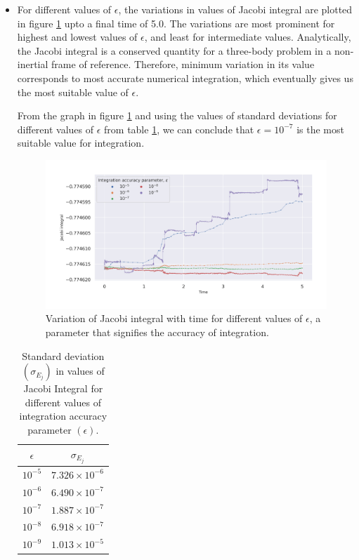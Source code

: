 \documentclass[a4paper]{article}
\begin{document}
		\begin{itemize}
			
			\item For different values of \(\epsilon\), the variations in values of Jacobi integral are plotted in figure \ref{fig:task1.3} upto a final time of 5.0. The variations are most prominent for highest and lowest values of \(\epsilon\), and least for intermediate values. Analytically, the Jacobi integral is a conserved quantity for a three-body problem in a non-inertial frame of reference. Therefore, minimum variation in its value corresponds to most accurate numerical integration, which eventually gives us the most suitable value of \(\epsilon\).
			
			From the graph in figure \ref{fig:task1.3} and using the values of standard deviations for different values of \(\epsilon\) from table \ref{table:task1.3}, we can conclude that \(\epsilon = 10^{-7}\) is the most suitable value for integration.
			
			\begin{figure} [h]
				\includegraphics[width=\columnwidth]{../task1/q3-epsilon/plots/q3.jpg}
				\caption{Variation of Jacobi integral with time for different values of \(\epsilon\), a parameter that signifies the accuracy of integration.}
				\label{fig:task1.3}
			\end{figure}
			
			\begin{table} [h]
				\centering
				\setlength{\tabcolsep}{20pt} 
				\begin{tabular} {c c}
					\toprule
					\textbf{\(\epsilon\)} & \textbf{\(\sigma_{E_j}\)} \\
					\midrule
					\addlinespace
					\(10^{-5}\) & \(7.326 \times 10^{-6}\)
					\\ 
					\(10^{-6}\) & \(6.490 \times 10^{-7}\) \\
					\(10^{-7}\) & \(1.887 \times 10^{-7}\) \\
					\(10^{-8}\) & \(6.918 \times 10^{-7}\) \\
					\(10^{-9}\) & \(1.013 \times 10^{-5}\) \\
					\bottomrule
				\end{tabular}
				\caption{Standard deviation \((\sigma_{E_j})\) in values of Jacobi Integral for different values of integration accuracy parameter \((\epsilon)\). }
				\label{table:task1.3}
			\end{table}
			

\end{itemize}
\end{document}
